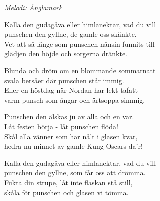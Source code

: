 {\footnotesize\textit{Melodi: Änglamark}}\par
\vspace{10pt}
Kalla den gudagåva eller himlanektar, vad du vill\\
punschen den gyllne, de gamle oss skänkte.\\
Vet att så länge som punschen nånsin funnits till\\
glädjen den höjde och sorgerna dränkte.\par
\vspace{10pt}
Blunda och dröm om en blommande sommarnatt\\
svala bersåer där punschen står immig.\\
Eller en höstdag när Nordan har lekt tafatt\\
varm punsch som ångar och ärtsoppa simmig.\par
\vspace{10pt}
Punschen den älskas ju av alla och en var.\\
Låt festen börja - låt punschen flöda!\\
Skål alla vänner som har nå't i glasen kvar,\\
hedra nu minnet av gamle Kung Oscars da'r!\par
\vspace{10pt}
Kalla den gudagåva eller himlanektar, vad du vill\\
punschen den gyllne, som får oss att drömma.\\
Fukta din strupe, låt inte flaskan stå still,\\
skåla för punschen och glasen vi tömma.
